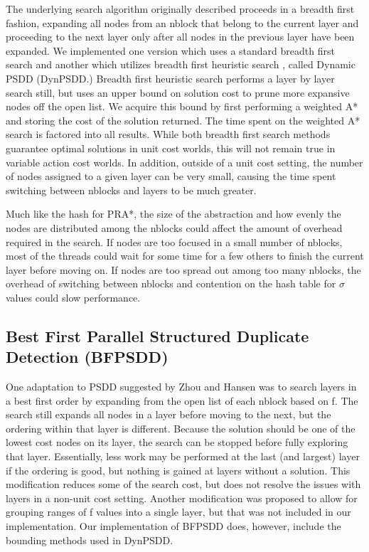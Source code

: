 \documentclass{article}
\begin{document}
The underlying search algorithm originally described proceeds in a breadth first fashion, expanding all nodes from an nblock that belong to the current layer and proceeding to the next layer only after all nodes in the previous layer have been expanded. We implemented one version which uses a standard breadth first search and another which utilizes breadth first heuristic search \cite{zhou:bhs}, called Dynamic PSDD (DynPSDD.) Breadth first heuristic search performs a layer by layer search still, but uses an upper bound on solution cost to prune more expansive nodes off the open list. We acquire this bound by first performing a weighted A* and storing the cost of the solution returned. The time spent on the weighted A* search is factored into all results. While both breadth first search methods guarantee optimal solutions in unit cost worlds, this will not remain true in variable action cost worlds. In addition, outside of a unit cost setting, the number of nodes assigned to a given layer can be very small, causing the time spent switching between nblocks and layers to be much greater.

Much like the hash for PRA*, the size of the abstraction and how evenly the nodes are distributed among the nblocks could affect the amount of overhead required in the search. If nodes are too focused in a small number of nblocks, most of the threads could wait for some time for a few others to finish the current layer before moving on. If nodes are too spread out among too many nblocks, the overhead of switching between nblocks and contention on the hash table for $\sigma$ values could slow performance.
\subsection{Best First Parallel Structured Duplicate Detection (BFPSDD)}
One adaptation to PSDD suggested by Zhou and Hansen was to search layers in a best first order \cite{zhou:sdd} by expanding from the open list of each nblock based on f. The search still expands all nodes in a layer before moving to the next, but the ordering within that layer is different. Because the solution should be one of the lowest cost nodes on its layer, the search can be stopped before fully exploring that layer. Essentially, less work may be performed at the last (and largest) layer if the ordering is good, but nothing is gained at layers without a solution. This modification reduces some of the search cost, but does not resolve the issues with layers in a non-unit cost setting. Another modification was proposed to allow for grouping ranges of f values into a single layer, but that was not included in our implementation. Our implementation of BFPSDD does, however, include the bounding methods used in DynPSDD.
\end{document}
